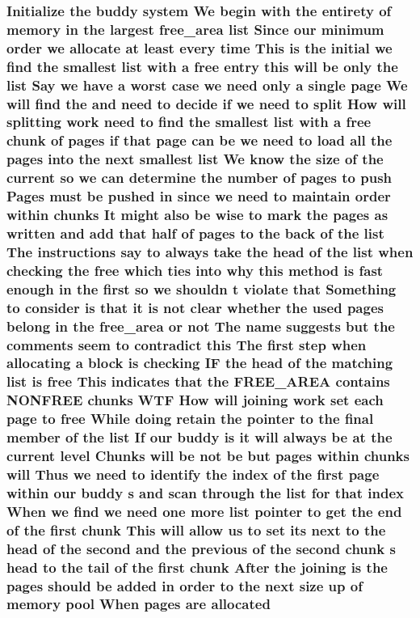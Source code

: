 \subsubsection[{\texorpdfstring{allocated}{allocated}}]{\setlength{\rightskip}{0pt plus 5cm}Initialize the buddy system We begin with the entirety of memory {\bf in} the largest {\bf free\+\_\+area} {\bf list} Since our minimum {\bf order} we allocate at least every time This {\bf is} the initial we find the smallest {\bf list} with a free entry this will be only the {\bf list} Say we have a worst case we need only a single {\bf page} We will find the and need to decide if we need to {\bf split} How will splitting work need to find the smallest {\bf list} with a free {\bf chunk} of {\bf pages} if that {\bf page} can be we need to load all the {\bf pages} into the next smallest {\bf list} We know the size of the current {\bf so} we can determine the number of {\bf pages} to push Pages must be pushed {\bf in} since we need to maintain {\bf order} within chunks It might also be wise to mark the {\bf pages} as written and add that half of {\bf pages} to the back of the {\bf list} The instructions say to always take the head of the {\bf list} when checking the free which ties into why this method {\bf is} fast enough {\bf in} the {\bf first} {\bf so} we shouldn t violate that Something to consider {\bf is} that {\bf it} {\bf is} {\bf not} clear whether the used {\bf pages} belong {\bf in} the {\bf free\+\_\+area} or {\bf not} The name suggests but the comments seem to contradict this The {\bf first} step when allocating a block {\bf is} checking IF the head of the matching {\bf list} {\bf is} free This indicates that the F\+R\+E\+E\+\_\+\+A\+R\+EA contains N\+O\+N\+F\+R\+EE chunks W\+TF How will joining work set each {\bf page} to free While doing retain the pointer to the final member of the {\bf list} If our buddy {\bf is} {\bf it} will always be at the current level Chunks will be {\bf not} be but {\bf pages} within chunks will Thus we need to identify the index of the {\bf first} {\bf page} within our buddy s and scan through the {\bf list} for that index When we find we need one more {\bf list} pointer to get the end of the {\bf first} {\bf chunk} This will allow us to set its next to the head of the second and the previous of the second {\bf chunk} s head to the tail of the {\bf first} {\bf chunk} After the joining {\bf is} the {\bf pages} should be added {\bf in} {\bf order} to the next size up of memory pool When {\bf pages} are allocated}\hypertarget{notes_8txt_a8f7e96f64f2d4d0e9eb1dc711bf5ba3d}{}\label{notes_8txt_a8f7e96f64f2d4d0e9eb1dc711bf5ba3d}


